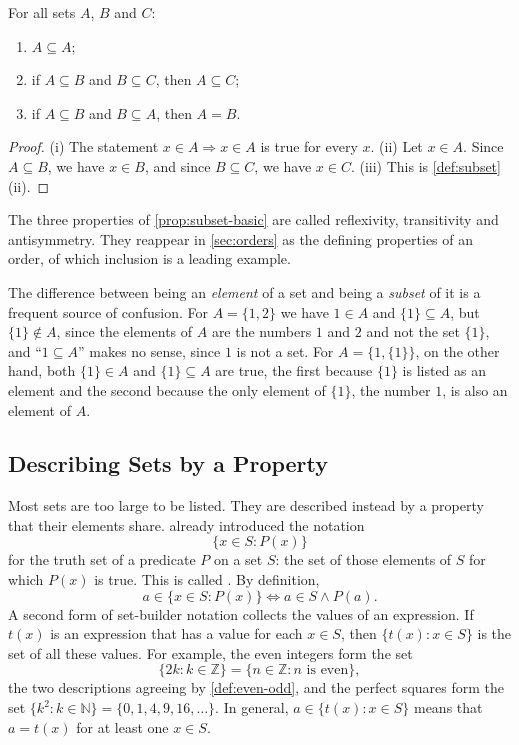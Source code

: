 \begin{proposition}
\label{prop:subset-basic}
For all sets $A$, $B$ and $C$:
\begin{enumerate}
\item $A\subseteq A$;
\item if $A\subseteq B$ and $B\subseteq C$, then $A\subseteq C$;
\item if $A\subseteq B$ and $B\subseteq A$, then $A=B$.
\end{enumerate}
\end{proposition}

\begin{proof}
(i) The statement $x\in A\Rightarrow x\in A$ is true for every $x$. (ii) Let $x\in A$. Since $A\subseteq B$, we have $x\in B$, and since $B\subseteq C$, we have $x\in C$. (iii) This is \cref{def:subset}\,(ii).
\end{proof}

The three properties of \cref{prop:subset-basic} are called reflexivity, transitivity and antisymmetry. They reappear in \cref{sec:orders} as the defining properties of an order, of which inclusion is a leading example.

The difference between being an \emph{element} of a set and being a \emph{subset} of it is a frequent source of confusion. For $A=\{1,2\}$ we have $1\in A$ and $\{1\}\subseteq A$, but $\{1\}\notin A$, since the elements of $A$ are the numbers $1$ and $2$ and not the set $\{1\}$, and ``$1\subseteq A$'' makes no sense, since $1$ is not a set. For $A=\{1,\{1\}\}$, on the other hand, both $\{1\}\in A$ and $\{1\}\subseteq A$ are true, the first because $\{1\}$ is listed as an element and the second because the only element of $\{1\}$, the number $1$, is also an element of $A$.

\subsection{Describing Sets by a Property}

Most sets are too large to be listed. They are described instead by a property that their elements share.  already introduced the notation
\[
\{x\in S: P(x)\}
\]
for the truth set of a predicate $P$ on a set $S$: the set of those elements of $S$ for which $P(x)$ is true. This is called . By definition,
\[
a\in\{x\in S: P(x)\}\iff a\in S\wedge P(a).
\]
A second form of set-builder notation collects the values of an expression. If $t(x)$ is an expression that has a value for each $x\in S$, then $\{t(x): x\in S\}$ is the set of all these values. For example, the even integers form the set
\[
\{2k: k\in\mathbb Z\}=\{n\in\mathbb Z: n\text{ is even}\},
\]
the two descriptions agreeing by \cref{def:even-odd}, and the perfect squares form the set $\{k^2: k\in\mathbb N\}=\{0,1,4,9,16,\ldots\}$. In general, $a\in\{t(x): x\in S\}$ means that $a=t(x)$ for at least one $x\in S$.

